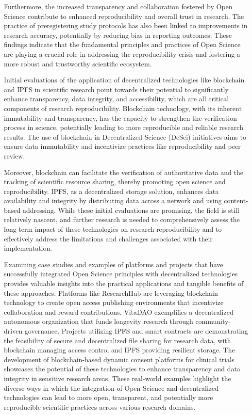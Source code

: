Furthermore, the increased transparency and collaboration fostered by Open Science contribute to enhanced reproducibility and overall trust in research. The practice of preregistering study protocols has also been linked to improvements in research accuracy, potentially by reducing bias in reporting outcomes. These findings indicate that the fundamental principles and practices of Open Science are playing a crucial role in addressing the reproducibility crisis and fostering a more robust and trustworthy scientific ecosystem.

Initial evaluations of the application of decentralized technologies like blockchain and IPFS in scientific research point towards their potential to significantly enhance transparency, data integrity, and accessibility, which are all critical components of research reproducibility. Blockchain technology, with its inherent immutability and transparency, has the capacity to strengthen the verification process in science, potentially leading to more reproducible and reliable research results. The use of blockchain in Decentralized Science (DeSci) initiatives aims to ensure data immutability and incentivize practices like reproducibility and peer review.

Moreover, blockchain can facilitate the verification of authoritative data and the tracking of scientific resource sharing, thereby promoting open science and reproducibility. IPFS, as a decentralized storage solution, enhances data availability and integrity by distributing data across a network and using content-based addressing. While these initial evaluations are promising, the field is still relatively nascent, and further research is needed to comprehensively assess the long-term impact of these technologies on research reproducibility and to effectively address the limitations and challenges associated with their implementation.

Examining case studies and examples of platforms and projects that have successfully integrated Open Science principles with decentralized technologies provides valuable insights into the practical applications and tangible benefits of these approaches. Platforms like ResearchHub are leveraging blockchain technology to create open access publishing environments that incentivize collaboration and reward contributions. VitaDAO exemplifies a decentralized autonomous organization that funds longevity research through community-driven governance. Projects utilizing IPFS and smart contracts are demonstrating the feasibility of secure and decentralized file sharing for research data, with blockchain managing access control and IPFS providing resilient storage. The development of blockchain-based dynamic consent platforms for clinical trials showcases the potential of these technologies to enhance transparency and data integrity in sensitive research areas. These real-world examples highlight the diverse ways in which the integration of Open Science and decentralized technologies can lead to more open, transparent, and potentially more reproducible scientific practices across various research domains.


